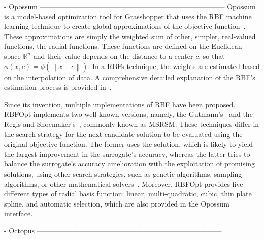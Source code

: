 - Opossum ------------------------------------------------------------------------------
Opossum is a model-based optimization tool for Grasshopper that uses the \ac{RBF} machine learning technique to create global approximations of the objective function~\cite{Forrester2009SBO}. These approximations are simply the weighted sum of other, simpler, real-valued functions, the radial functions. These functions are defined on the Euclidean space $\mathbb{R}^n$ and their value depends on the distance to a center $c$, so that $\phi(x, c) = \phi(\left\lVert x-c \right\rVert)$. In a \acp{RBF} technique, the weights are estimated based on the interpolation of data. A comprehensive detailed explanation of the \ac{RBF}'s estimation process is provided in~\cite{Forrester2009SBO}. 

Since its invention, multiple implementations of \ac{RBF} have been proposed. RBFOpt implements two well-known versions, namely, the Gutmann's~\cite{Gutmann2001} and the Regis and Shoemaker's~\cite{Regis2007}, commonly known as MSRSM. These techniques differ in the search strategy for the next candidate solution to be evaluated using the original objective function. The former uses the solution, which is likely to yield the largest improvement in the surrogate's accuracy, whereas the latter tries to balance the surrogate's accuracy amelioration with the exploitation of promising solutions, using other search strategies, such as genetic algorithms, sampling algorithms, or other mathematical solvers~\cite{Wortmann2017Opossum}. Moreover, RBFOpt provides five different types of radial basis function: linear, multi-quadratic, cubic, thin plate spline, and automatic selection, which are also provided in the Opossum interface.

- Octopus ------------------------------------------------------------------------------

